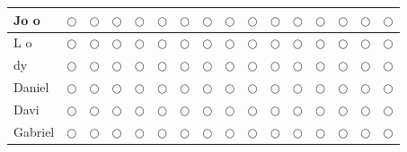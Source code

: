 \documentclass{article}
\begin{document}
\begin{center}
\begin{longtable}{ |p{6cm}|c|c|c|c|c|c|c|c|c|c|c|c|c|c|c|}
\hline
Jo o 
&$\bigcirc$
&$\bigcirc$&$\bigcirc$&$\bigcirc$&$\bigcirc$&$\bigcirc$&$\bigcirc$&$\bigcirc$&$\bigcirc$&$\bigcirc$&$\bigcirc$&$\bigcirc$&$\bigcirc$&$\bigcirc$&$\bigcirc$\\
\hline
L o 
&$\bigcirc$
&$\bigcirc$&$\bigcirc$&$\bigcirc$&$\bigcirc$&$\bigcirc$&$\bigcirc$&$\bigcirc$&$\bigcirc$&$\bigcirc$&$\bigcirc$&$\bigcirc$&$\bigcirc$&$\bigcirc$&$\bigcirc$\\
\hline
 dy 
&$\bigcirc$&$\bigcirc$
&$\bigcirc$&$\bigcirc$&$\bigcirc$&$\bigcirc$&$\bigcirc$&$\bigcirc$&$\bigcirc$&$\bigcirc$&$\bigcirc$&$\bigcirc$&$\bigcirc$&$\bigcirc$&$\bigcirc$\\
\hline
Daniel 
&$\bigcirc$
&$\bigcirc$&$\bigcirc$&$\bigcirc$&$\bigcirc$&$\bigcirc$&$\bigcirc$&$\bigcirc$&$\bigcirc$&$\bigcirc$&$\bigcirc$&$\bigcirc$&$\bigcirc$&$\bigcirc$&$\bigcirc$\\
\hline
Davi 
&$\bigcirc$&$\bigcirc$
&$\bigcirc$&$\bigcirc$&$\bigcirc$&$\bigcirc$&$\bigcirc$&$\bigcirc$&$\bigcirc$&$\bigcirc$&$\bigcirc$&$\bigcirc$&$\bigcirc$&$\bigcirc$&$\bigcirc$\\
\hline
Gabriel 
&$\bigcirc$&$\bigcirc$
&$\bigcirc$&$\bigcirc$&$\bigcirc$&$\bigcirc$&$\bigcirc$&$\bigcirc$&$\bigcirc$&$\bigcirc$&$\bigcirc$&$\bigcirc$&$\bigcirc$&$\bigcirc$&$\bigcirc$\\
\hline


\end{longtable}
\end{center}
\end{document}
